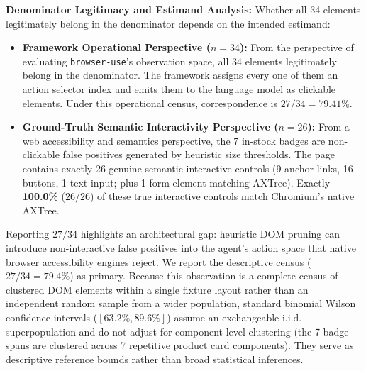 \documentclass[11pt,a4paper]{article}
\begin{document}
\textbf{Denominator Legitimacy and Estimand Analysis:}
Whether all 34 elements legitimately belong in the denominator depends on the intended estimand:
\begin{itemize}
    \item \textbf{Framework Operational Perspective ($n=34$):} From the perspective of evaluating \texttt{browser-use}'s observation space, all 34 elements legitimately belong in the denominator. The framework assigns every one of them an action selector index and emits them to the language model as clickable elements. Under this operational census, correspondence is $27/34 = 79.41\%$.
    \item \textbf{Ground-Truth Semantic Interactivity Perspective ($n=26$):} From a web accessibility and semantics perspective, the 7 in-stock badges are non-clickable false positives generated by heuristic size thresholds. The page contains exactly 26 genuine semantic interactive controls (9 anchor links, 16 buttons, 1 text input; plus 1 form element matching AXTree). Exactly \textbf{100.0\%} ($26/26$) of these true interactive controls match Chromium's native AXTree.
\end{itemize}
Reporting $27/34$ highlights an architectural gap: heuristic DOM pruning can introduce non-interactive false positives into the agent's action space that native browser accessibility engines reject. We report the descriptive census ($27/34 = 79.4\%$) as primary. Because this observation is a complete census of clustered DOM elements within a single fixture layout rather than an independent random sample from a wider population, standard binomial Wilson confidence intervals ($[63.2\%, 89.6\%]$) assume an exchangeable i.i.d. superpopulation and do not adjust for component-level clustering (the 7 badge spans are clustered across 7 repetitive product card components). They serve as descriptive reference bounds rather than broad statistical inferences.
\end{document}
